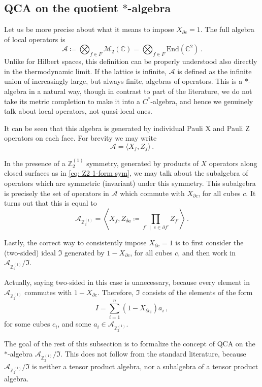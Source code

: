 \documentclass[aps,twocolumn,prx,floatfix,preprintnumbers, nofootinbib,10pt]{revtex4-2}
\numberwithin{equation}{section}
\theoremstyle{definition}
\theoremstyle{remark}
\theoremstyle{claim}
\newcommand{\be}{\begin{equation}}
\newcommand{\ee}{\end{equation}}
\newcommand{\Z}{{\mathbb Z}}
\newcommand{\End}{\text{End}}
\newcommand{\mc}[1]{\mathcal{#1}}
\begin{document}
\subsection{QCA on the quotient $*$-algebra}\label{sec:qca_on_quotient_algebra}

Let us be more precise about what it means to impose $X_{\partial c} = 1$. The full algebra of local operators is
\be
\mathcal{A} \coloneqq \bigotimes_{f \in F} \mathcal{M}_2(\mathbb{C}) = \bigotimes_{f \in F} \End(\mathbb{C}^2) \,.
\ee
Unlike for Hilbert spaces, this definition can be properly understood also directly in the thermodynamic limit. If the lattice is infinite, $\mc{A}$ is defined as the infinite union of increasingly large, but always finite, algebras of operators. 
This is a $*$-algebra in a natural way, though in contrast to part of the literature, we do not take its metric completion to make it into a $C^*$-algebra, and hence we genuinely talk about local operators, not quasi-local ones.

It can be seen that this algebra is generated by individual Pauli X and Pauli Z operators on each face. For brevity we may write
\be
\mathcal{A} = \langle X_f, Z_f \rangle \,.
\ee

In the presence of a $\Z_2^{(1)}$ symmetry, generated by products of $X$ operators along closed surfaces {as in \eqref{eq: Z2 1-form sym}}, we may talk about the subalgebra of operators which are symmetric (invariant) under this symmetry. This subalgebra is precisely the set of operators in $\mathcal{A}$ which commute with $X_{\partial c}$, for all cubes $c$. It turns out that this is equal to
\be
\mathcal{A}_{\Z_2^{(1)}} = \left\langle X_f, Z_{\delta \bm{e}} \coloneqq \prod_{f' \; \mid \; e \in \partial f'} Z_{f'} \right\rangle \,.
\ee

Lastly, the correct way to consistently impose $X_{\partial c} = 1$ is to first consider the (two-sided) ideal $\mathfrak{I}$ generated by $1 - X_{\partial c}$, for all cubes $c$, and then work in $\mc{A}_{\Z_2^{(1)}} / \mathfrak{I}$.

Actually, saying two-sided in this case is unnecessary, because every element in $\mathcal{A}_{\Z_2^{(1)}}$ commutes with $1 - X_{\partial c}$. Therefore, $\mathfrak{I}$ consists of the elements of the form
\be
I = \sum_{i = 1}^n (1 - X_{\partial c_i}) a_i \,,
\ee
for some cubes $c_i$, and some $a_i \in \mathcal{A}_{\Z_2^{(1)}}$.

The goal of the rest of this subsection is to formalize the concept of QCA on the $*$-algebra $\mathcal{A}_{\Z_2^{(1)}} / \mathfrak{I}$. This does not follow from the standard literature, because $\mathcal{A}_{\Z_2^{(1)}} / \mathfrak{I}$ is neither a tensor product algebra, nor a subalgebra of a tensor product algebra.
\end{document}

